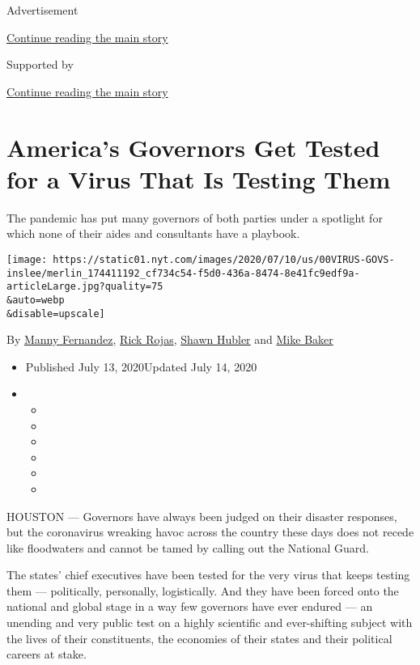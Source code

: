 Advertisement

\protect\hyperlink{after-top}{Continue reading the main story}

Supported by

\protect\hyperlink{after-sponsor}{Continue reading the main story}

\hypertarget{americas-governors-get-tested-for-a-virus-that-is-testing-them}{%
\section{America's Governors Get Tested for a Virus That Is Testing
Them}\label{americas-governors-get-tested-for-a-virus-that-is-testing-them}}

The pandemic has put many governors of both parties under a spotlight
for which none of their aides and consultants have a playbook.

\texttt{[image: https://static01.nyt.com/images/2020/07/10/us/00VIRUS-GOVS-inslee/merlin\_174411192\_cf734c54-f5d0-436a-8474-8e41fc9edf9a-articleLarge.jpg?quality=75\\\&auto=webp\\\&disable=upscale]}

By \href{https://www.nytimes.com/by/manny-fernandez}{Manny Fernandez},
\href{https://www.nytimes.com/by/rick-rojas}{Rick Rojas},
\href{https://www.nytimes.com/by/shawn-hubler}{Shawn Hubler} and
\href{https://www.nytimes.com/by/mike-baker}{Mike Baker}

\begin{itemize}
\item
  Published July 13, 2020Updated July 14, 2020
\item
  \begin{itemize}
  \item
  \item
  \item
  \item
  \item
  \item
  \end{itemize}
\end{itemize}

HOUSTON --- Governors have always been judged on their disaster
responses, but the coronavirus wreaking havoc across the country these
days does not recede like floodwaters and cannot be tamed by calling out
the National Guard.

The states' chief executives have been tested for the very virus that
keeps testing them --- politically, personally, logistically. And they
have been forced onto the national and global stage in a way few
governors have ever endured --- an unending and very public test on a
highly scientific and ever-shifting subject with the lives of their
constituents, the economies of their states and their political careers
at stake.

